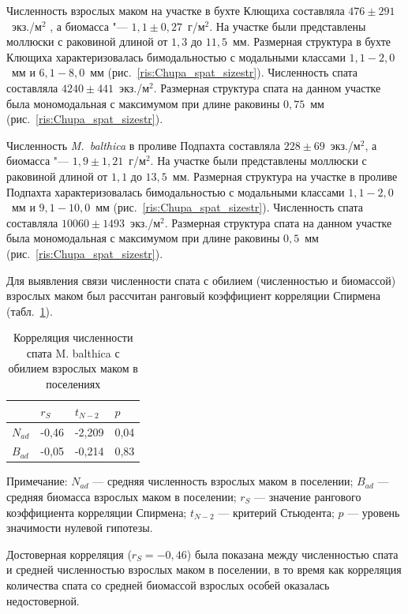 Численность взрослых маком на участке в бухте Клющиха составляла $476 \pm 291$~экз./м$^2$ , а биомасса "--- $1,1 \pm 0,27$~г/м$^2$. 
На участке были представлены моллюски с раковиной длиной от $1,3$ до $11,5$~мм. 
Размерная структура в бухте Клющиха характеризовалась бимодальностью с модальными классами $1,1 - 2,0$~мм и $6,1 - 8,0$~мм (рис.~\ref{ris:Chupa_spat_sizestr}). 
Численность спата составляла $4240 \pm 441$~экз./м$^2$. 
Размерная структура спата на данном участке была мономодальная с максимумом при длине раковины $0,75$~мм (рис.~\ref{ris:Chupa_spat_sizestr}).

Численность {\it M.~balthica} в проливе Подпахта составляла $228 \pm 69$~экз./м$^2$, а биомасса "--- $1,9 \pm 1,21$~г/м$^2$. 
На участке были представлены моллюски с раковиной длиной от $1,1$ до $13,5$~мм. 
Размерная структура на участке в проливе Подпахта характеризовалась бимодальностью с модальными классами $1,1 - 2,0$~мм и $9,1 - 10,0$~мм (рис.~\ref{ris:Chupa_spat_sizestr}). 
Численность спата составляла $10060 \pm 1493$~экз./м$^2$. 
Размерная структура спата на данном участке была мономодальная с максимумом при длине раковины $0,5$~мм (рис.~\ref{ris:Chupa_spat_sizestr}).

Для выявления связи численности спата с обилием (численностью и биомассой) взрослых маком был рассчитан ранговый коэффициент корреляции Спирмена (табл.~\ref{spat_abult_correlation}). 
\begin{table}[h]
\caption{Корреляция численности спата M. balthica с  обилием взрослых маком в поселениях}
\label{spat_abult_correlation}
\begin{center}
\begin{tabular}{|l|lll|}
\hline
     & $r_S$    & $t_{N-2}$   & $p$    \\ \hline
$N_{ad}$ & -0,46 & -2,209 & 0,04 \\
$B_{ad}$ & -0,05 & -0,214 & 0,83\\ \hline
\end{tabular}
\end{center}

\footnotesize{Примечание: $N_{ad}$ --- средняя численность взрослых маком в поселении; 
$B_{ad}$ --- средняя биомасса взрослых маком в поселении; 
$r_S$ --- значение рангового коэффициента корреляции Спирмена; 
$t_{N-2}$ --- критерий Стьюдента;   
$p$ --- уровень значимости нулевой гипотезы.}
\end{table}
Достоверная корреляция ($r_S = -0,46$) была показана между численностью спата и средней численностью взрослых маком в поселении, в то время как корреляция количества спата со средней биомассой взрослых особей оказалась недостоверной.

